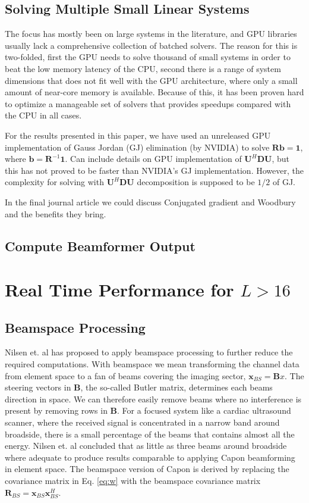 \documentclass[journal]{IEEEtran}
\newcommand{\mat}[1]{\mathbf{#1}}
\renewcommand{\vec}[1]{\mathbf{#1}}
\begin{document}
\subsection{Solving Multiple Small Linear Systems}
The focus has mostly been on large systems in the literature, and GPU libraries usually lack a comprehensive collection of batched solvers. The reason for this is two-folded, first the GPU needs to solve thousand of small systems in order to beat the low memory latency of the CPU, second there is a range of system dimensions that does not fit well with the GPU architecture, where only a small amount of near-core memory is available. Because of this, it has been proven hard to optimize a manageable set of solvers that provides speedups compared with the CPU in all cases.

For the results presented in this paper, we have used an unreleased GPU implementation of Gauss Jordan (GJ) elimination (by NVIDIA) to solve $\mat{R}\vec{b} = \vec{1}$, where $\vec{b} = \mat{R}^{-1}\vec{1}$. Can include details on GPU implementation of $\mat{U}^H\mat{D}\mat{U}$, but this has not proved to be faster than NVIDIA's GJ implementation. However, the complexity for solving with $\mat{U}^H\mat{D}\mat{U}$ decomposition is supposed to be $1/2$ of GJ.

In the final journal article we could discuss Conjugated gradient and Woodbury and the benefits they bring.

\subsection{Compute Beamformer Output}

\section{Real Time Performance for $L > 16$}\label{sec:meth2}

\subsection{Beamspace Processing}
Nilsen et. al \cite{Nilsen2009} has proposed to apply beamspace processing to further reduce the required computations. With beamspace we mean transforming the channel data from element space to a fan of beams covering the imaging sector, $\vec{x}_{BS} = \mat{B}x$.  The steering vectors in $\mat{B}$, the so-called Butler matrix, determines each beams direction in space. We can therefore easily remove beams where no interference is present by removing rows in $\mat{B}$. For a focused system like a cardiac ultrasound scanner, where the received signal is concentrated in a narrow band around broadside, there is a small percentage of the beams that contains almost all the energy. Nilsen et. al concluded that as little as three beams around broadside where adequate to produce results comparable to applying Capon beamforming in element space. The beamspace version of Capon is derived by replacing the covariance matrix in Eq. \ref{eq:w} with the beamspace covariance matrix $\mat{R}_{BS} = \vec{x}_{BS}\vec{x}_{BS}^H$.  
\end{document}
